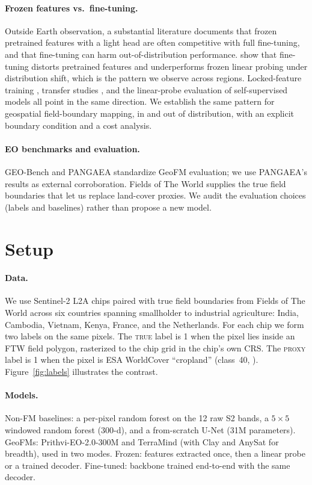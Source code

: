 \documentclass{article}
\begin{document}
\paragraph{Frozen features vs.\ fine-tuning.} Outside Earth observation, a
substantial literature documents that frozen pretrained features with a light head
are often competitive with full fine-tuning, and that fine-tuning can harm
out-of-distribution performance. \citet{kumar2022finetuning} show that fine-tuning
distorts pretrained features and underperforms frozen linear probing under
distribution shift, which is the pattern we observe across regions. Locked-feature
training \citep{zhai2022lit}, transfer studies
\citep{kornblith2019transfer,kolesnikov2020bit}, and the linear-probe evaluation of
self-supervised models \citep{he2022mae} all point in the same direction. We
establish the same pattern for geospatial field-boundary mapping, in and out of
distribution, with an explicit boundary condition and a cost analysis.

\paragraph{EO benchmarks and evaluation.} GEO-Bench \citep{geobench} and PANGAEA
\citep{pangaea} standardize GeoFM evaluation; we use PANGAEA's results as external
corroboration. Fields of The World \citep{ftw} supplies the true field boundaries
that let us replace land-cover proxies. We audit the evaluation choices (labels and
baselines) rather than propose a new model.

\section{Setup}
\label{sec:setup}
\paragraph{Data.} We use Sentinel-2 L2A chips paired with true field boundaries from
Fields of The World \citep{ftw} across six countries spanning smallholder to
industrial agriculture: India, Cambodia, Vietnam, Kenya, France, and the Netherlands.
For each chip we form two labels on the same pixels. The \textsc{true} label is 1
when the pixel lies inside an FTW field polygon, rasterized to the chip grid in the
chip's own CRS. The \textsc{proxy} label is 1 when the pixel is ESA WorldCover
``cropland'' (class~40, \citep{worldcover}). Figure~\ref{fig:labels} illustrates the
contrast.

\paragraph{Models.} Non-FM baselines: a per-pixel random forest on the 12 raw S2
bands, a $5\times5$ windowed random forest (300-d), and a from-scratch U-Net
\citep{unet} (31M parameters). GeoFMs: Prithvi-EO-2.0-300M \citep{prithvi} and
TerraMind \citep{terramind} (with Clay and AnySat for breadth), used in two modes.
Frozen: features extracted once, then a linear probe or a trained decoder.
Fine-tuned: backbone trained end-to-end with the same decoder.
\end{document}
